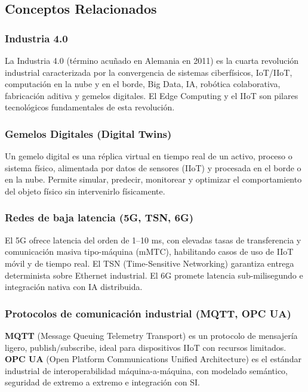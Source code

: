 ﻿\documentclass[12pt,a4paper,oneside]{article}
\begin{document}
\subsection{Conceptos Relacionados}

\subsubsection{Industria 4.0}

La Industria 4.0 (término acuñado en Alemania en 2011) es la cuarta revolución industrial caracterizada por la convergencia de sistemas ciberfísicos, IoT/IIoT, computación en la nube y en el borde, Big Data, IA, robótica colaborativa, fabricación aditiva y gemelos digitales. El Edge Computing y el IIoT son pilares tecnológicos fundamentales de esta revolución.

\subsubsection{Gemelos Digitales (Digital Twins)}

Un gemelo digital es una réplica virtual en tiempo real de un activo, proceso o sistema físico, alimentada por datos de sensores (IIoT) y procesada en el borde o en la nube. Permite simular, predecir, monitorear y optimizar el comportamiento del objeto físico sin intervenirlo físicamente.

\subsubsection{Redes de baja latencia (5G, TSN, 6G)}

El 5G ofrece latencia del orden de 1--10 ms, con elevadas tasas de transferencia y comunicación masiva tipo-máquina (mMTC), habilitando casos de uso de IIoT móvil y de tiempo real. El TSN (Time-Sensitive Networking) garantiza entrega determinista sobre Ethernet industrial. El 6G promete latencia sub-milisegundo e integración nativa con IA distribuida.

\subsubsection{Protocolos de comunicación industrial (MQTT, OPC UA)}

\textbf{MQTT} (Message Queuing Telemetry Transport) es un protocolo de mensajería ligero, publish/subscribe, ideal para dispositivos IIoT con recursos limitados. \textbf{OPC UA} (Open Platform Communications Unified Architecture) es el estándar industrial de interoperabilidad máquina-a-máquina, con modelado semántico, seguridad de extremo a extremo e integración con SI.
\end{document}
